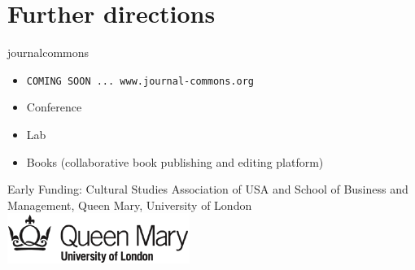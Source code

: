 \section{Further directions}
\begin{frame}{journalcommons}{}
 
\begin{itemize}
 \item {\tt COMING SOON ... www.journal-commons.org}
 \item Conference
 \item Lab
 \item Books (collaborative book publishing and editing platform)
\end{itemize}

\vfill

Early Funding: Cultural Studies Association of USA and School of
Business and Management, Queen Mary, University of London
\includegraphics[scale=0.5]{qm_logo.png}

\end{frame}
